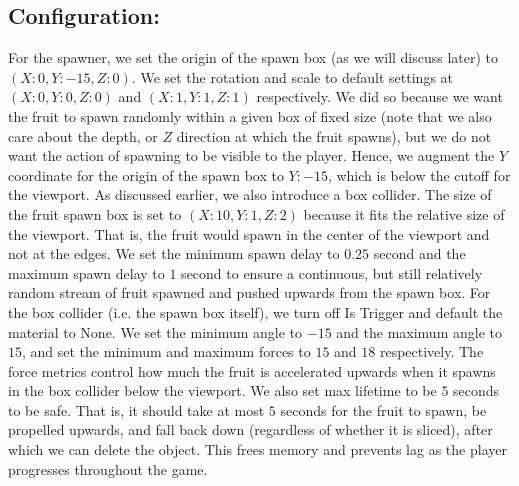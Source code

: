\subsection{Configuration:}
For the spawner, we set the origin of the spawn box (as we will discuss later) to $(X: 0, Y: -15, Z: 0)$. We set the rotation and scale to default settings at $(X: 0, Y: 0, Z: 0)$ and 
$(X: 1, Y: 1, Z: 1)$ respectively. We did so because we want the fruit to spawn randomly within a given box of fixed size (note that we also care about the depth, or $Z$ direction at 
which the fruit spawns), but we do not want the action of spawning to be visible to the 
player. Hence, we augment the $Y$ coordinate for the origin of the spawn box to $Y: -15$, which is below the cutoff for the viewport. As discussed earlier, we also introduce a box 
collider. The size of the fruit spawn box is set to $(X: 10, Y: 1, Z: 2)$ because it fits the relative size of the viewport. That is, the fruit would spawn in the center of the viewport 
and not at the edges. We set the minimum spawn delay to $0.25$ second and the maximum spawn delay to $1$ second to ensure a continuous, but still relatively random stream of fruit spawned and pushed 
upwards from the spawn box. For the box collider (i.e. the spawn box itself), we turn off Is Trigger and default the material to None. We set the minimum angle to $-15$ and the maximum 
angle to $15$, and set the minimum and maximum forces to $15$ and $18$ respectively. The force metrics control how much the fruit is accelerated upwards when it spawns in the box collider 
below the viewport. We also set max lifetime to be $5$ seconds to be safe. That is, it should take at most $5$ seconds for the fruit to spawn, be propelled upwards, and fall back down 
(regardless of whether it is sliced), after which we can delete the object. This frees memory and prevents lag as the player progresses throughout the game.
\\\\
